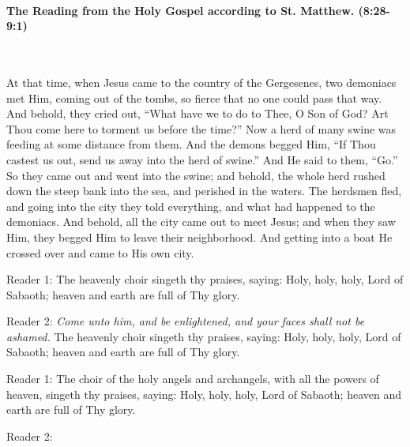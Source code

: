 \documentclass[twoside, letterpaper, 12pt]{report}
\begin{document}


\paragraph{The Reading from the Holy Gospel according to St. Matthew. (8:28-9:1)}\mbox{}\\

\begin{maybetwocolumns}
  At that time, when Jesus came to the country of the Gergesenes, two demoniacs met Him,
  coming out of the tombs, so fierce that no one could pass that way. And behold, they cried out,
  “What have we to do to Thee, O Son of God? Art Thou come here to torment us before the time?”
  Now a herd of many swine was feeding at some distance from them. And the demons begged Him,
  “If Thou castest us out, send us away into the herd of swine.” And He said to them, “Go.” So they
  came out and went into the swine; and behold, the whole herd rushed down the steep bank into the
  sea, and perished in the waters. The herdsmen fled, and going into the city they told everything,
  and what had happened to the demoniacs. And behold, all the city came out to meet Jesus; and
  when they saw Him, they begged Him to leave their neighborhood. And getting into a boat He
  crossed over and came to His own city.
\end{maybetwocolumns}

\begin{reader}
\item[Reader 1:] The heavenly choir singeth thy praises, saying:
  Holy, holy, holy, Lord of Sabaoth; heaven and earth are full of Thy glory.

\item[Reader 2:] \emph{Come unto him, and be enlightened,
               and your faces shall not be ashamed.}
  The heavenly choir singeth thy praises, saying:
  Holy, holy, holy, Lord of Sabaoth; heaven and earth are full of Thy glory.

\item[Reader 1:] \emph{\glory}
  The choir of the holy angels and archangels,
  with all the powers of heaven, singeth thy praises, saying:
  Holy, holy, holy, Lord of Sabaoth; heaven and earth are full of Thy glory.

\item[Reader 2:]\emph{\nowandever}
\end{reader}
\end{document}
